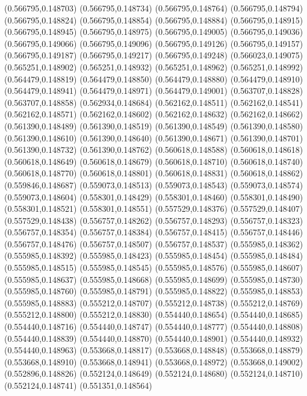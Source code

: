 (0.566795,0.148703)
(0.566795,0.148734)
(0.566795,0.148764)
(0.566795,0.148794)
(0.566795,0.148824)
(0.566795,0.148854)
(0.566795,0.148884)
(0.566795,0.148915)
(0.566795,0.148945)
(0.566795,0.148975)
(0.566795,0.149005)
(0.566795,0.149036)
(0.566795,0.149066)
(0.566795,0.149096)
(0.566795,0.149126)
(0.566795,0.149157)
(0.566795,0.149187)
(0.566795,0.149217)
(0.566795,0.149248)
(0.566023,0.149075)
(0.565251,0.148902)
(0.565251,0.148932)
(0.565251,0.148962)
(0.565251,0.148992)
(0.564479,0.148819)
(0.564479,0.148850)
(0.564479,0.148880)
(0.564479,0.148910)
(0.564479,0.148941)
(0.564479,0.148971)
(0.564479,0.149001)
(0.563707,0.148828)
(0.563707,0.148858)
(0.562934,0.148684)
(0.562162,0.148511)
(0.562162,0.148541)
(0.562162,0.148571)
(0.562162,0.148602)
(0.562162,0.148632)
(0.562162,0.148662)
(0.561390,0.148489)
(0.561390,0.148519)
(0.561390,0.148549)
(0.561390,0.148580)
(0.561390,0.148610)
(0.561390,0.148640)
(0.561390,0.148671)
(0.561390,0.148701)
(0.561390,0.148732)
(0.561390,0.148762)
(0.560618,0.148588)
(0.560618,0.148618)
(0.560618,0.148649)
(0.560618,0.148679)
(0.560618,0.148710)
(0.560618,0.148740)
(0.560618,0.148770)
(0.560618,0.148801)
(0.560618,0.148831)
(0.560618,0.148862)
(0.559846,0.148687)
(0.559073,0.148513)
(0.559073,0.148543)
(0.559073,0.148574)
(0.559073,0.148604)
(0.558301,0.148429)
(0.558301,0.148460)
(0.558301,0.148490)
(0.558301,0.148521)
(0.558301,0.148551)
(0.557529,0.148376)
(0.557529,0.148407)
(0.557529,0.148438)
(0.556757,0.148262)
(0.556757,0.148293)
(0.556757,0.148323)
(0.556757,0.148354)
(0.556757,0.148384)
(0.556757,0.148415)
(0.556757,0.148446)
(0.556757,0.148476)
(0.556757,0.148507)
(0.556757,0.148537)
(0.555985,0.148362)
(0.555985,0.148392)
(0.555985,0.148423)
(0.555985,0.148454)
(0.555985,0.148484)
(0.555985,0.148515)
(0.555985,0.148545)
(0.555985,0.148576)
(0.555985,0.148607)
(0.555985,0.148637)
(0.555985,0.148668)
(0.555985,0.148699)
(0.555985,0.148730)
(0.555985,0.148760)
(0.555985,0.148791)
(0.555985,0.148822)
(0.555985,0.148853)
(0.555985,0.148883)
(0.555212,0.148707)
(0.555212,0.148738)
(0.555212,0.148769)
(0.555212,0.148800)
(0.555212,0.148830)
(0.554440,0.148654)
(0.554440,0.148685)
(0.554440,0.148716)
(0.554440,0.148747)
(0.554440,0.148777)
(0.554440,0.148808)
(0.554440,0.148839)
(0.554440,0.148870)
(0.554440,0.148901)
(0.554440,0.148932)
(0.554440,0.148963)
(0.553668,0.148817)
(0.553668,0.148848)
(0.553668,0.148879)
(0.553668,0.148910)
(0.553668,0.148941)
(0.553668,0.148972)
(0.553668,0.149002)
(0.552896,0.148826)
(0.552124,0.148649)
(0.552124,0.148680)
(0.552124,0.148710)
(0.552124,0.148741)
(0.551351,0.148564)
